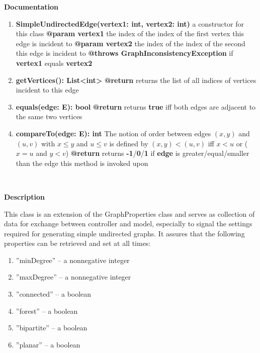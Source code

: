	\textbf{Documentation}
	\begin{enumerate}[+]
		\item{
			\textbf{SimpleUndirectedEdge(vertex1: int, vertex2: int)} \newline
			a constructor for this class \newline
			\textbf{@param vertex1} the index of the index of the first vertex this edge is incident to \newline
			\textbf{@param vertex2} the index of the index of the second this edge is incident to \newline
			\textbf{@throws GraphInconsistencyException} if \textbf{vertex1} equals \textbf{vertex2}
		}
		\item{
			\textbf{getVertices(): List<int>} \newline
			\textbf{@return} returns the list of all indices of vertices incident to this edge
		}
		\item{
			\textbf{equals(edge: E): bool} \newline
			\textbf{@return} returns \textbf{true} iff both edges are adjacent to the same two vertices
		}
		\item{
			\textbf{compareTo(edge: E): int} \newline
			The notion of order between edges $(x,y)$ and $(u,v)$ with $x\leq y$ and $u\leq v$ is defined by $(x,y)<(u,v)$ iff $x<u$ or ($x=u$ and $y < v$) \newline
			\textbf{@return} returns \textbf{-1}/\textbf{0}/\textbf{1} if \textbf{edge} is greater/equal/smaller than the edge this method is invoked upon
		}
	\end{enumerate}
	
	~\newline
	~\newline
	~\newline
	
	
	\textbf{Description}
	
	This class is an extension of the GraphProperties class and serves as collection of data for exchange between controller and model, especially to signal the settings required for generating simple undirected graphs. It assures that the following properties can be retrieved and set at all times:
	
	\begin{enumerate}[--]
		\item{''minDegree'' -- a nonnegative integer}
		\item{''maxDegree'' -- a nonnegative integer}
		\item{''connected'' -- a boolean}
		\item{''forest'' -- a boolean}
		\item{''bipartite'' -- a boolean}
		\item{''planar'' -- a boolean}
	\end{enumerate}
	
